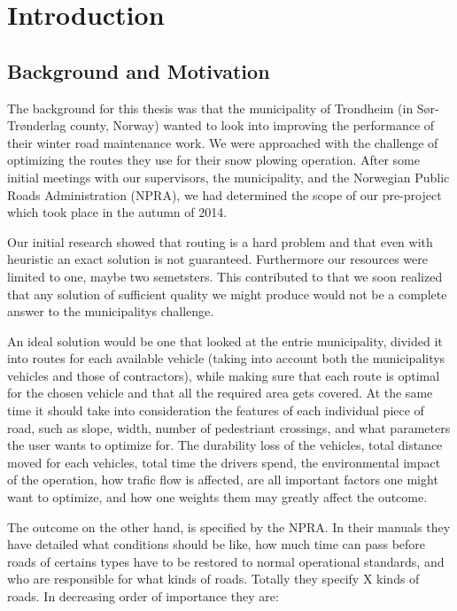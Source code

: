 \chapter{Introduction}

\section{Background and Motivation}

The background for this thesis was that the municipality of Trondheim (in Sør-Trønderlag county, Norway) wanted to look into improving the performance of their winter road maintenance work. We were approached with the challenge of optimizing the routes they use for their snow plowing operation. After some initial meetings with our supervisors, the municipality, and the Norwegian Public Roads Administration (NPRA), we had determined the scope of our pre-project which took place in the autumn of 2014.

Our initial research showed that routing is a hard problem and that even with heuristic an exact solution is not guaranteed. Furthermore our resources were limited to one, maybe two semetsters. This contributed to that we soon realized that any solution of sufficient quality we might produce would not be a complete answer to the municipalitys challenge.

An ideal solution would be one that looked at the entrie municipality, divided it into routes for each available vehicle (taking into account both the municipalitys vehicles and those of contractors), while making sure that each route is optimal for the chosen vehicle and that all the required area gets covered. At the same time it should take into consideration the features of each individual piece of road, such as slope, width, number of pedestriant crossings, and what parameters the user wants to optimize for. The durability loss of the vehicles, total distance moved for each vehicles, total time the drivers spend, the environmental impact of the operation, how trafic flow is affected, are all important factors one might want to optimize, and how one weights them may greatly affect the outcome.

The outcome on the other hand, is specified by the NPRA. In their manuals they have detailed what conditions should be like, how much time can pass before roads of certains types have to be restored to normal operational standards, and who are responsible for what kinds of roads. Totally they specify X kinds of roads. In decreasing order of importance they are:

